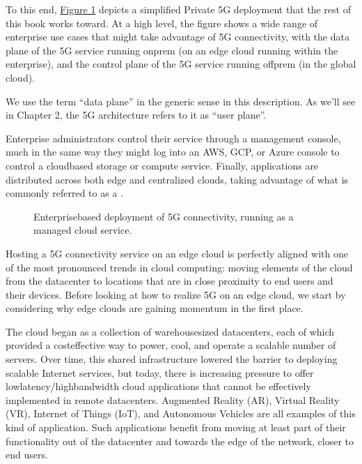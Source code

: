 \documentclass[a4paper,11pt,english]{sphinxmanual}
\let\sphinxpxdimen\pdfpxdimen\else\newdimen\sphinxpxdimen
\begin{document}
\sphinxAtStartPar
To this end, \hyperref[\detokenize{intro:fig-enterprise}]{Figure \ref{\detokenize{intro:fig-enterprise}}} depicts a simplified
Private 5G deployment that the rest of this book works toward. At a
high level, the figure shows a wide range of enterprise use cases that
might take advantage of 5G connectivity, with the data plane of the 5G
service running on\sphinxhyphen{}prem (on an edge cloud running within the
enterprise), and the control plane of the 5G service running off\sphinxhyphen{}prem
(in the global cloud).%
\begin{footnote}[1]\sphinxAtStartFootnote
We use the term “data plane” in the generic sense in this
description. As we’ll see in Chapter 2, the 5G architecture
refers to it as “user plane”.
%
\end{footnote} Enterprise administrators control their
service through a management console, much in the same way they might
log into an AWS, GCP, or Azure console to control a cloud\sphinxhyphen{}based
storage or compute service. Finally, applications are distributed
across both edge and centralized clouds, taking advantage of what is
commonly referred to as a .

\begin{figure}[ht]
\centering
\capstart

\noindent\sphinxincludegraphics[width=600\sphinxpxdimen]{{Slide14}.png}
\caption{Enterprise\sphinxhyphen{}based deployment of 5G connectivity, running as a
managed cloud service.}\label{\detokenize{intro:id4}}\label{\detokenize{intro:fig-enterprise}}\end{figure}

\sphinxAtStartPar
Hosting a 5G connectivity service on an edge cloud is perfectly
aligned with one of the most pronounced trends in cloud computing:
moving elements of the cloud from the datacenter to locations that are
in close proximity to end users and their devices. Before looking at
how to realize 5G on an edge cloud, we start by considering why edge
clouds are gaining momentum in the first place.

\sphinxAtStartPar
The cloud began as a collection of warehouse\sphinxhyphen{}sized datacenters, each
of which provided a cost\sphinxhyphen{}effective way to power, cool, and operate a
scalable number of servers. Over time, this shared infrastructure
lowered the barrier to deploying scalable Internet services, but
today, there is increasing pressure to offer
low\sphinxhyphen{}latency/high\sphinxhyphen{}bandwidth cloud applications that cannot be
effectively implemented in remote datacenters. Augmented Reality (AR),
Virtual Reality (VR), Internet of Things (IoT), and Autonomous
Vehicles are all examples of this kind of application. Such
applications benefit from moving at least part of their functionality
out of the datacenter and towards the edge of the network, closer to
end users.
\end{document}
